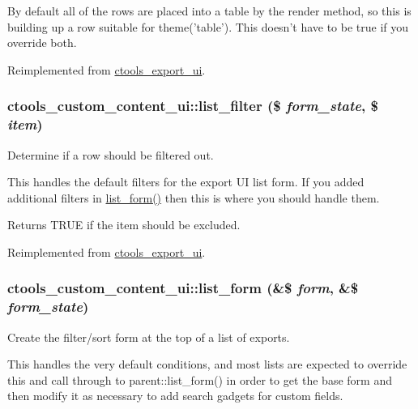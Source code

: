By default all of the rows are placed into a table by the render method, so this is building up a row suitable for theme('table'). This doesn't have to be true if you override both. 

Reimplemented from \hyperlink{classctools__export__ui_ad72f3d7170f48e0d0cb1dacb2926bb78}{ctools\_\-export\_\-ui}.\hypertarget{classctools__custom__content__ui_a3b389db39e1d13eb7beca1c35e8edf16}{
\subsubsection[{list\_\-filter}]{\setlength{\rightskip}{0pt plus 5cm}ctools\_\-custom\_\-content\_\-ui::list\_\-filter (\$ {\em form\_\-state}, \/  \$ {\em item})}}
\label{classctools__custom__content__ui_a3b389db39e1d13eb7beca1c35e8edf16}
Determine if a row should be filtered out.

This handles the default filters for the export UI list form. If you added additional filters in \hyperlink{classctools__custom__content__ui_a530636bea39fd3a90e7ffca2760643ec}{list\_\-form()} then this is where you should handle them.

\begin{DoxyReturn}{Returns}
TRUE if the item should be excluded. 
\end{DoxyReturn}


Reimplemented from \hyperlink{classctools__export__ui_aed7f3b1a8d7564168f89e2b450c6aa4a}{ctools\_\-export\_\-ui}.\hypertarget{classctools__custom__content__ui_a530636bea39fd3a90e7ffca2760643ec}{
\subsubsection[{list\_\-form}]{\setlength{\rightskip}{0pt plus 5cm}ctools\_\-custom\_\-content\_\-ui::list\_\-form (\&\$ {\em form}, \/  \&\$ {\em form\_\-state})}}
\label{classctools__custom__content__ui_a530636bea39fd3a90e7ffca2760643ec}
Create the filter/sort form at the top of a list of exports.

This handles the very default conditions, and most lists are expected to override this and call through to parent::list\_\-form() in order to get the base form and then modify it as necessary to add search gadgets for custom fields. 

